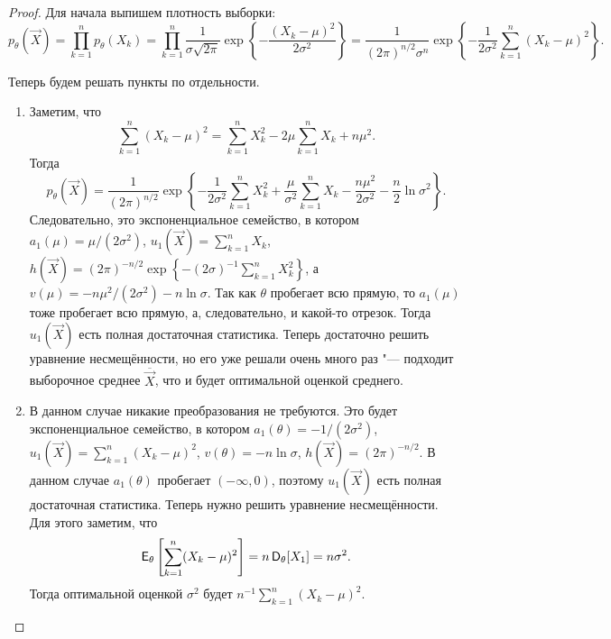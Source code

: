 \begin{proof}
	Для начала выпишем плотность выборки:
	\[
		p_{\theta}(\vec{X})
		= \prod_{k = 1}^{n} p_{\theta}(X_{k})
		= \prod_{k = 1}^{n} \frac{1}{\sigma\sqrt{2\pi}}\exp\left\{-\frac{(X_{k} - \mu)^{2}}{2\sigma^{2}}\right\}
		= \frac{1}{(2\pi)^{n/2}\sigma^{n}}\exp\left\{-\frac{1}{2\sigma^{2}}\sum_{k = 1}^{n} (X_{k} - \mu)^{2}\right\}.
	\]

	Теперь будем решать пункты по отдельности.
	\begin{enumerate}[label=(\alph*)]
		\item Заметим, что
		\[
			\sum_{k = 1}^{n} (X_{k} - \mu)^{2} 
			= \sum_{k = 1}^{n} X_{k}^{2} - 2\mu\sum_{k = 1}^{n} X_{k} + n\mu^{2}.
		\]
		Тогда
		\[
			p_{\theta}(\vec{X})
			= \frac{1}{(2\pi)^{n/2}}\exp\left\{-\frac{1}{2\sigma^{2}}\sum_{k = 1}^{n} X_{k}^{2} + \frac{\mu}{\sigma^{2}}\sum_{k = 1}^{n} X_{k} - \frac{n\mu^{2}}{2\sigma^{2}} - \frac{n}{2}\ln \sigma^{2}\right\}.
		\]
		Следовательно, это экспоненциальное семейство, в котором $a_{1}(\mu) = \mu/(2\sigma^{2})$, $u_{1}(\vec{X}) = \sum_{k = 1}^{n} X_{k}$, $h(\vec{X}) = (2\pi)^{-n/2}\exp\left\{-(2\sigma)^{-1}\sum_{k = 1}^{n} X_{k}^{2}\right\}$, а $v(\mu) = -n\mu^{2}/(2\sigma^{2}) - n\ln\sigma$. Так как $\theta$ пробегает всю прямую, то $a_{1}(\mu)$ тоже пробегает всю прямую, а, следовательно, и какой-то отрезок. Тогда $u_{1}(\vec{X})$ есть полная достаточная статистика. Теперь достаточно решить уравнение несмещённости, но его уже решали очень много раз "--- подходит выборочное среднее $\overline{\vec{X}}$, что и будет оптимальной оценкой среднего.

		\item В данном случае никакие преобразования не требуются. Это будет экспоненциальное семейство, в котором $a_{1}(\theta) = -1/(2\sigma^{2})$, $u_{1}(\vec{X}) = \sum_{k = 1}^{n} (X_{k} - \mu)^{2}$, $v(\theta) = -n\ln\sigma$, $h(\vec{X}) = (2\pi)^{-n/2}$. В данном случае $a_{1}(\theta)$ пробегает $(-\infty, 0)$, поэтому $u_{1}(\vec{X})$ есть полная достаточная статистика. Теперь нужно решить уравнение несмещённости. Для этого заметим, что
		\[
			\operatorname{\mathsf{E}}_{\theta}\left[\sum_{k = 1}^{n} (X_{k} - \mu)^{2}\right]
			= n\operatorname{\mathsf{D}}_{\theta}[X_{1}]
			= n\sigma^{2}.
		\]
		Тогда оптимальной оценкой $\sigma^{2}$ будет $n^{-1}\sum_{k = 1}^{n} (X_{k} - \mu)^{2}$.


\end{enumerate}
\end{proof}
